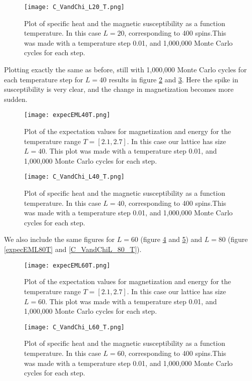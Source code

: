 \documentclass{aa}   %
\begin{document}
\begin{figure}
 \texttt{[image: C\_VandChi\_L20\_T.png]}
 \caption{Plot of specific heat and the magnetic susceptibility as a function temperature. In this case $L=20$, corresponding to 400 spins.This was made with a temperature step 0.01, and 1,000,000 Monte Carlo cycles for each step.}
\label{C_VandChiL_20_T}
\end{figure}

Plotting exactly the same as before, still with 1,000,000 Monte Carlo cycles for each temperature step for $L=40$ results in figure \ref{expecEML40T} and \ref{C_VandChiL_40_T}. Here the spike in susceptibility is very clear, and the change in magnetization becomes more sudden.

\begin{figure}
 \texttt{[image: expecEML40T.png]}
 \caption{Plot of the expectation values for magnetization and energy for the temperature range $T=[2.1,2.7]$. In this case our lattice has size $L=40$. This plot was made with a temperature step 0.01, and 1,000,000 Monte Carlo cycles for each step.}
\label{expecEML40T}
\end{figure}

\begin{figure}
 \texttt{[image: C\_VandChi\_L40\_T.png]}
 \caption{Plot of specific heat and the magnetic susceptibility as a function temperature. In this case $L=40$, corresponding to 400 spins.This was made with a temperature step 0.01, and 1,000,000 Monte Carlo cycles for each step.}
\label{C_VandChiL_40_T}
\end{figure}

We also include the same figures for $L=60$ (figure \ref{expecEML60T} and \ref{C_VandChiL_60_T}) and $L=80$ (figure \ref{expecEML80T} and \ref{C_VandChiL_80_T}).

\begin{figure}
 \texttt{[image: expecEML60T.png]}
 \caption{Plot of the expectation values for magnetization and energy for the temperature range $T=[2.1,2.7]$. In this case our lattice has size $L=60$. This plot was made with a temperature step 0.01, and 1,000,000 Monte Carlo cycles for each step.}
\label{expecEML60T}
\end{figure}

\begin{figure}
 \texttt{[image: C\_VandChi\_L60\_T.png]}
 \caption{Plot of specific heat and the magnetic susceptibility as a function temperature. In this case $L=60$, corresponding to 400 spins.This was made with a temperature step 0.01, and 1,000,000 Monte Carlo cycles for each step.}
\label{C_VandChiL_60_T}
\end{figure}
\end{document}
